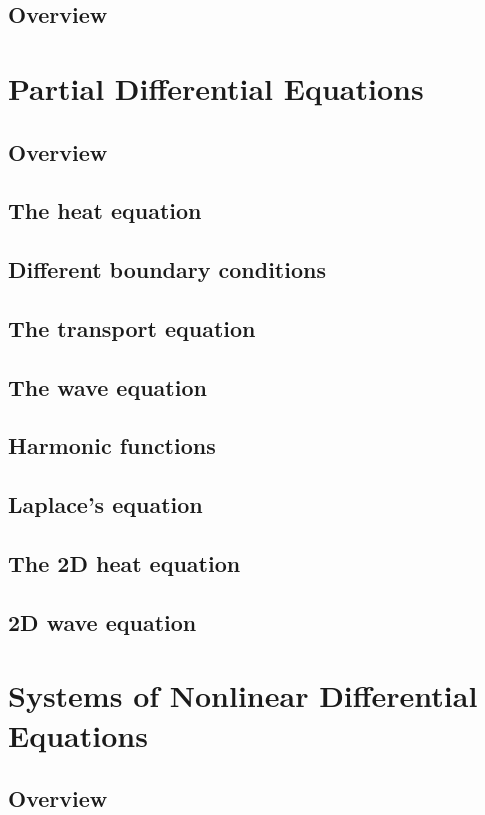 \documentclass{article}
\begin{document}
\subsection*{Overview}


\pagebreak
\section{Partial Differential Equations}
\subsection*{Overview}

\subsection{The heat equation}
\subsection{Different boundary conditions}
\subsection{The transport equation}
\subsection{The wave equation}
\subsection{Harmonic functions}
\subsection{Laplace's equation}
\subsection{The 2D heat equation}
\subsection{2D wave equation}

\pagebreak

\section{Systems of Nonlinear Differential Equations}

\subsection*{Overview}
\end{document}
